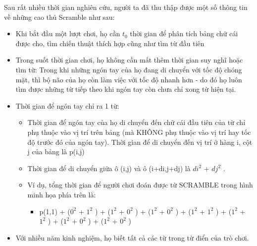 Sau rất nhiều thời gian nghiên cứu, người ta đã thu thập được một số thông tin về những cao thủ Scramble như sau:
\begin{itemize}
	\item Khi bắt đầu một lượt chơi, họ cần $t_{0}$ thời gian để phân tích bảng chữ cái được cho, tìm chiến thuật thích hợp cũng như tìm từ đầu tiên
	\item Trong suốt thời gian chơi, họ không cần mất thêm thời gian suy nghĩ hoặc tìm từ: Trong khi những ngón tay của họ đang di chuyển với tốc độ chóng mặt, thì bộ não của họ còn làm việc với tốc độ nhanh hơn - do đó họ luôn tìm được những từ tiếp theo khi ngón tay còn chưa chỉ xong từ hiện tại.
	\item Thời gian để ngón tay chỉ ra 1 từ:
\begin{itemize}
	\item Thời gian để ngón tay của họ di chuyển đến chữ cái đầu tiên của từ chỉ phụ thuộc vào vị trí trên bảng (mà KHÔNG phụ thuộc vào vị trí hay tốc độ trước đó của ngón tay). Thời gian để di chuyển đến vị trí ở hàng i, cột j của bảng là p(i,j)
	\item Thời gian để di chuyển giữa ô (i,j) và ô (i+di,j+dj) là $di^{2}$ + $dj^{2}$ .
	\item Ví dụ, tổng thời gian để người chơi đoán được từ SCRAMBLE trong hình minh họa phía trên là:
\begin{itemize}
	\item p(1,1) + ($0^{2}$ + $1^{2}$ ) + ($1^{2}$ + $0^{2}$ ) + ($1^{2}$ + $0^{2}$ ) + ($1^{2}$ + $1^{2}$ ) + ($1^{2}$ + $1^{2}$ ) + ($1^{2}$ + $0^{2}$ ) + ($1^{2}$ + $0^{2}$ )
\end{itemize}
\end{itemize}
	\item Với nhiều năm kinh nghiệm, họ biết tất cả các từ trong từ điển của trò chơi.
\end{itemize}

